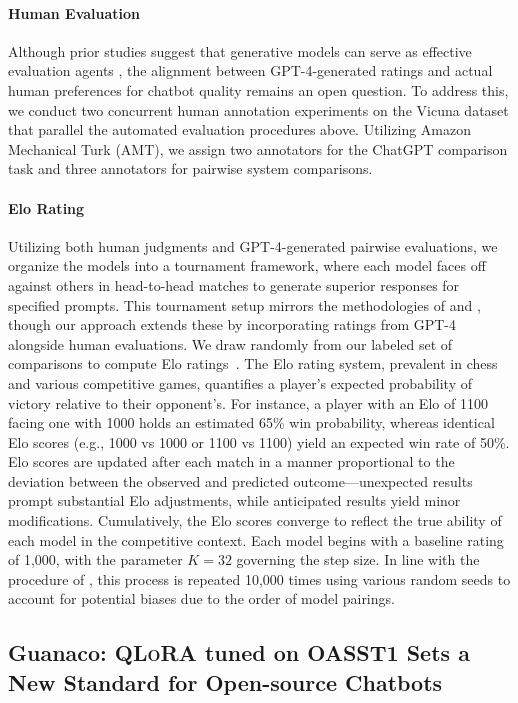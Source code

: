 \paragraph{Human Evaluation} Although prior studies suggest that generative models can serve as effective evaluation agents \citep{fu2023gptscore}, the alignment between GPT-4-generated ratings and actual human preferences for chatbot quality remains an open question. To address this, we conduct two concurrent human annotation experiments on the Vicuna dataset that parallel the automated evaluation procedures above. Utilizing Amazon Mechanical Turk (AMT), we assign two annotators for the ChatGPT comparison task and three annotators for pairwise system comparisons.

\paragraph{Elo Rating} Utilizing both human judgments and GPT-4-generated pairwise evaluations, we organize the models into a tournament framework, where each model faces off against others in head-to-head matches to generate superior responses for specified prompts. This tournament setup mirrors the methodologies of \citet{bai2022training} and \citet{vicuna2023}, though our approach extends these by incorporating ratings from GPT-4 alongside human evaluations. We draw randomly from our labeled set of comparisons to compute Elo ratings~\citep{elo1967proposed,elo1978rating}. The Elo rating system, prevalent in chess and various competitive games, quantifies a player's expected probability of victory relative to their opponent's. For instance, a player with an Elo of 1100 facing one with 1000 holds an estimated 65\% win probability, whereas identical Elo scores (e.g., 1000 vs 1000 or 1100 vs 1100) yield an expected win rate of 50\%. Elo scores are updated after each match in a manner proportional to the deviation between the observed and predicted outcome—unexpected results prompt substantial Elo adjustments, while anticipated results yield minor modifications. Cumulatively, the Elo scores converge to reflect the true ability of each model in the competitive context. Each model begins with a baseline rating of 1,000, with the parameter $K=32$ governing the step size. In line with the procedure of \citet{vicuna2023}, this process is repeated 10,000 times using various random seeds to account for potential biases due to the order of model pairings.

\subsection{\textbf{Guanaco}: \textsc{QLoRA} tuned on OASST1 Sets a New Standard for Open-source Chatbots} 

